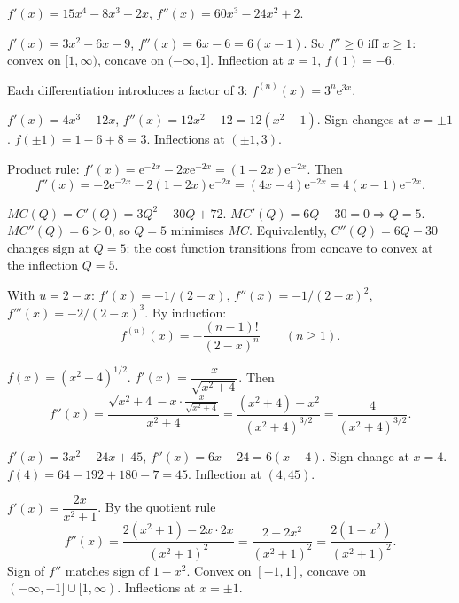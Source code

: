\begin{solutions}
  \item $f'(x)=15x^{4}-8x^{3}+2x$, $f''(x)=60x^{3}-24x^{2}+2$.

  \item $f'(x)=3x^{2}-6x-9$, $f''(x)=6x-6=6(x-1)$. So $f''\geq 0$ iff
        $x\geq 1$: convex on $[1,\infty)$, concave on $(-\infty,1]$.
        Inflection at $x=1$, $f(1)=-6$.

  \item Each differentiation introduces a factor of $3$:
        $f^{(n)}(x)=3^{n}\mathrm{e}^{3x}$.

  \item $f'(x)=4x^{3}-12x$, $f''(x)=12x^{2}-12=12(x^{2}-1)$. Sign changes
        at $x=\pm 1$. $f(\pm 1)=1-6+8=3$. Inflections at $(\pm 1,3)$.

  \item Product rule:
        $f'(x)=\mathrm{e}^{-2x}-2x\mathrm{e}^{-2x}=(1-2x)\mathrm{e}^{-2x}$.
        Then
        \[
          f''(x)=-2\mathrm{e}^{-2x}-2(1-2x)\mathrm{e}^{-2x}
                =(4x-4)\mathrm{e}^{-2x}=4(x-1)\mathrm{e}^{-2x} .
        \]

  \item $MC(Q)=C'(Q)=3Q^{2}-30Q+72$. $MC'(Q)=6Q-30=0\Rightarrow Q=5$.
        $MC''(Q)=6>0$, so $Q=5$ minimises $MC$. Equivalently,
        $C''(Q)=6Q-30$ changes sign at $Q=5$: the cost function
        transitions from concave to convex at the inflection $Q=5$.

  \item With $u=2-x$: $f'(x)=-1/(2-x)$, $f''(x)=-1/(2-x)^{2}$,
        $f'''(x)=-2/(2-x)^{3}$. By induction:
        \[
          f^{(n)}(x)=-\frac{(n-1)!}{(2-x)^{n}}\qquad (n\geq 1) .
        \]

  \item $f(x)=(x^{2}+4)^{1/2}$. $f'(x)=\dfrac{x}{\sqrt{x^{2}+4}}$. Then
        \[
          f''(x)=\frac{\sqrt{x^{2}+4}-x\cdot\frac{x}{\sqrt{x^{2}+4}}}
                       {x^{2}+4}
                =\frac{(x^{2}+4)-x^{2}}{(x^{2}+4)^{3/2}}
                =\frac{4}{(x^{2}+4)^{3/2}} .
        \]

  \item $f'(x)=3x^{2}-24x+45$, $f''(x)=6x-24=6(x-4)$. Sign change at
        $x=4$. $f(4)=64-192+180-7=45$. Inflection at $(4,45)$.

  \item $f'(x)=\dfrac{2x}{x^{2}+1}$. By the quotient rule
        \[
          f''(x)=\frac{2(x^{2}+1)-2x\cdot 2x}{(x^{2}+1)^{2}}
                =\frac{2-2x^{2}}{(x^{2}+1)^{2}}
                =\frac{2(1-x^{2})}{(x^{2}+1)^{2}} .
        \]
        Sign of $f''$ matches sign of $1-x^{2}$. Convex on $[-1,1]$,
        concave on $(-\infty,-1]\cup[1,\infty)$. Inflections at
        $x=\pm 1$.


\end{solutions}
